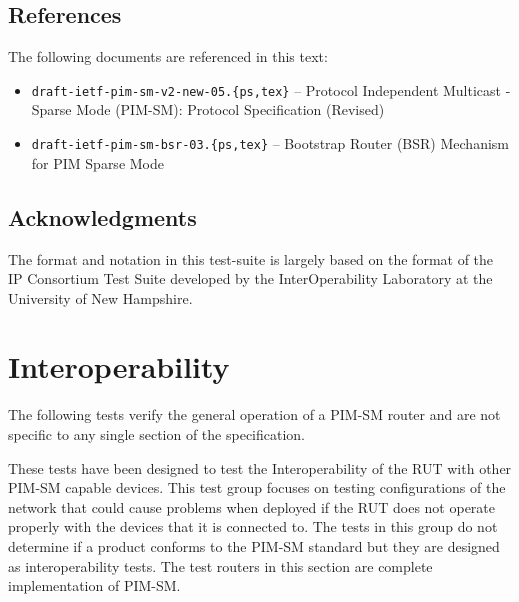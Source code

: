 \documentclass[11pt]{report}
\begin{document}
\section{References}
\label{sec:references}

The following documents are referenced in this text:

\begin{itemize}

 \item \verb=draft-ietf-pim-sm-v2-new-05.{ps,tex}= -- Protocol Independent
		  Multicast - Sparse Mode (PIM-SM): Protocol Specification
		  (Revised)

 \item \verb=draft-ietf-pim-sm-bsr-03.{ps,tex}= -- Bootstrap Router (BSR)
		  Mechanism for PIM Sparse Mode

\end{itemize}


\section{Acknowledgments}
The format and notation in this test-suite is largely based on the format of
the IP Consortium Test Suite developed by the InterOperability Laboratory at
the University of New Hampshire.

%
%
\renewcommand{\chaptername}{Test Group}
\newcommand{\para}[1]{\vspace{1ex}\noindent{\large\bf #1}}
\newcommand{\subpara}[1]{\vspace{1ex}\noindent\emph{#1}}

\chapter{Interoperability}

\para{Scope:}
The following tests verify the general operation of a PIM-SM router and are
not specific to any single section of the specification.

\para{Overview:}
These tests have been designed to test the Interoperability of the RUT with
other PIM-SM capable devices. This test group focuses on testing
configurations of the network that could cause problems when deployed if the
RUT does not operate properly with the devices that it is connected to. The
tests in this group do not determine if a product conforms to the PIM-SM
standard but they are designed as interoperability tests. The test routers in
this section are complete implementation of PIM-SM.
\end{document}
